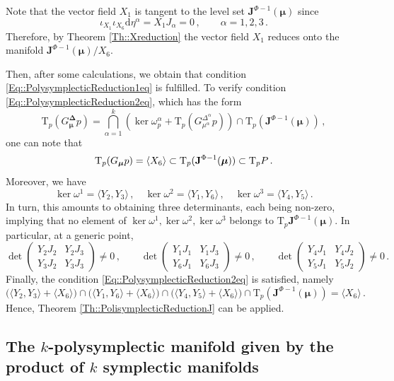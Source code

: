 \documentclass[11pt]{article}
\theoremstyle{plain}
\theoremstyle{definition}
\newcommand{\T}{\mathrm{T}}
\renewcommand{\d}{\mathrm{d}}
\def\d{\mathrm{d}}
\numberwithin{equation}{section}
\begin{document}
Note that the vector field $X_1$  is tangent to the level set  $\mathbf{J}^{\Phi-1}(\boldsymbol{\mu})$ since
\[
\iota_{X_1}\iota_{X_6}\d\eta^\alpha=X_1J_\alpha=0\,,\qquad \alpha=1,2,3\,.
\]
Therefore, by Theorem \ref{Th::Xreduction} the vector field $X_1$ reduces onto the manifold $\mathbf{J}^{\Phi-1}(\boldsymbol{\mu})/X_6$.



Then, after some calculations, we obtain that condition \eqref{Eq::PolysymplecticReduction1eq} is fulfilled. To verify condition \eqref{Eq::PolysymplecticReduction2eq}, which has the form
\[
      \T_p(G_{\boldsymbol\mu}^{\boldsymbol\Delta} p) = \bigcap^k_{\alpha=1}\left(\ker\omega^\alpha_p+\T_p(G^{\Delta^\alpha}_{\mu^\alpha}p)\right)\cap \T_p(\mathbf{J}^{\Phi-1}(\boldsymbol\mu))\,,
\]
one can note that 
$$
\T_p(G_{\bm \mu} p)=\langle X_6\rangle\subset \T_p({\bf J}^{\Phi-1}(\bm{\mu}))\subset \T_p P\,.  
$$
Moreover, we have
\[
    \ker\omega^1=\langle Y_2,Y_3\rangle\,,\quad \ker \omega^2=\langle Y_1,Y_6\rangle \,,\quad \ker \omega^3=\langle Y_4, Y_5\rangle\,.
\]
In turn, this amounts to obtaining three determinants, each being non-zero, implying that no element of $\ker \omega^1, \ker \omega^2,\ker \omega^3$ belongs to $\T_p\mathbf{J}^{\Phi-1}(\bm{\mu})$. In particular, at a generic point,
$$
\det \begin{pmatrix}
    Y_2J_2&Y_2J_3\\Y_3J_2&Y_3J_3
\end{pmatrix}\neq 0\,,\qquad
\det \begin{pmatrix}
    Y_1J_1&Y_1J_3\\Y_6J_1&Y_6J_3
\end{pmatrix}\neq 0\,,\qquad
\det \begin{pmatrix}
    Y_4J_1&Y_4J_2\\Y_5J_1&Y_5J_2
\end{pmatrix}\neq 0\,.
$$
Finally, the condition \eqref{Eq::PolysymplecticReduction2eq} is satisfied, namely
\[
\big(\langle Y_2,Y_3\rangle +\langle X_6\rangle\big)\cap\big(\langle Y_1,Y_6\rangle +\langle X_6\rangle\big)\cap\big(\langle Y_4,Y_5\rangle +\langle X_6\rangle\big)\cap \T_p(\mathbf{J}^{\Phi-1}(\bm\mu))=\langle X_6\rangle\,.
\]
Hence, Theorem \ref{Th::PolisymplecticReductionJ} can be applied.



\subsection{The \texorpdfstring{$k$}{}-polysymplectic manifold given by the product of \texorpdfstring{$k$}{} symplectic manifolds}
\end{document}
